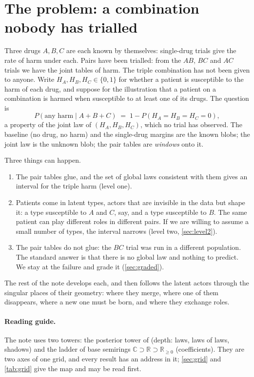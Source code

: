 \documentclass[11pt]{article}
\theoremstyle{definition}\newtheorem{definition}[theorem]{Definition}\newtheorem{remark}[theorem]{Remark}\newtheorem{example}[theorem]{Example}
\newcommand{\R}{\mathbb R}
\begin{document}
\section{The problem: a combination nobody has trialled}\label{sec:problem}

Three drugs $A,B,C$ are each known by themselves: single-drug trials give the rate of harm under each. Pairs have been trialled: from the
$AB$, $BC$ and $AC$ trials we have the joint tables of harm. The triple combination has not been given to anyone. Write $H_A,H_B,H_C\in
\{0,1\}$ for whether a patient is susceptible to the harm of each drug, and suppose for the illustration that a patient on a combination
is harmed when susceptible to at least one of its drugs. The question is
\[
  P(\text{any harm}\mid A{+}B{+}C) \;=\; 1-P(H_A=H_B=H_C=0),
\]
a property of the joint law of $(H_A,H_B,H_C)$, which no trial has observed. The baseline (no drug, no harm) and the single-drug margins are
the known blobs; the joint law is the unknown blob; the pair tables are \emph{windows} onto it.

Three things can happen.
\begin{enumerate}[leftmargin=*,itemsep=2pt]
\item The pair tables glue, and the set of global laws consistent with them gives an interval for the triple harm (level one).
\item Patients come in latent types, actors that are invisible in the data but shape it: a type susceptible to $A$ and $C$, say, and a
type susceptible to $B$. The same patient can play different roles in different pairs. If we are willing to assume a small number of types,
the interval narrows (level two, \cref{sec:level2}).
\item The pair tables do not glue: the $BC$ trial was run in a different population. The standard answer is that there is no global
law and nothing to predict. We stay at the failure and grade it (\cref{sec:graded}).
\end{enumerate}
The rest of the note develops each, and then follows the latent actors through the singular places of their geometry: where they merge,
where one of them disappears, where a new one must be born, and where they exchange roles.

\paragraph{Reading guide.} The note uses two towers: the posterior tower of \cite{Tower,TowerGeometry} (depth: laws, laws of laws, shadows) and the ladder of base semirings $\mathbb C\supset\R\supset\R_{\ge0}$ (coefficients). They are two axes of one grid, and every result has an address in it; \cref{sec:grid} and \cref{tab:grid} give the map and may be read first.
\end{document}
